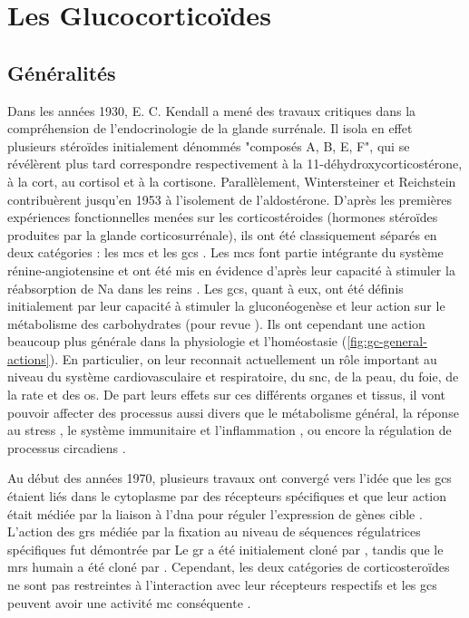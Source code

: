 \documentclass[../main.tex]{subfiles}
\begin{document}
\chapter{Les Glucocorticoïdes}


\section{Généralités}
Dans les années 1930, E. C. Kendall a mené des travaux critiques dans la compréhension de l'endocrinologie de la glande surrénale.
Il isola en effet plusieurs stéroïdes initialement dénommés "composés A, B, E, F", qui se révélèrent plus tard correspondre respectivement à la 11-déhydroxycorticostérone, à la \gls{cort}, au cortisol et à la cortisone.
Parallèlement, Wintersteiner et Reichstein contribuèrent jusqu'en 1953 à l'isolement de l'aldostérone.
D'après les premières expériences fonctionnelles menées sur les corticostéroides (hormones stéroïdes produites par la glande corticosurrénale), ils ont été classiquement séparés en deux catégories : les \glspl{mc} et les \glspl{gc} \citep{Simpson1952,Simpson1954}.
Les \glspl{mc} font partie intégrante du système rénine-angiotensine et ont été mis en évidence d'après leur capacité à stimuler la réabsorption de \gls{Na} dans les reins \citep{Gomez-Sanchez1996}.
Les \glspl{gc}, quant à eux, ont été définis initialement par leur capacité à stimuler la gluconéogenèse et leur action sur le métabolisme des carbohydrates (pour revue \citealp{McMahon1988}).
Ils ont cependant une action beaucoup plus générale dans la physiologie et l'homéostasie (\autoref{fig:gc-general-actions}).
En particulier, on leur reconnait actuellement un rôle important au niveau du système cardiovasculaire et respiratoire, du \gls{snc}, de la peau, du foie, de la rate et des os.
De part leurs effets sur ces différents organes et tissus, il vont pouvoir affecter des processus aussi divers que le métabolisme général, la réponse au stress \citep{Sapolsky2000}, le système immunitaire et l'inflammation \citep{Busillo2013}, ou encore la régulation de processus circadiens \citep{Dickmeis2009}.



Au début des années 1970, plusieurs travaux ont convergé vers l'idée que les \glspl{gc} étaient liés dans le cytoplasme par des récepteurs spécifiques \citep{Baxter1971,Rousseau1972} et que leur action était médiée par la liaison à l'\gls{dna} pour réguler l'expression de gènes cible \citep{Baxter1972,Payvar1981}.
L'action des \glspl{gr} médiée par la fixation au niveau de séquences régulatrices spécifiques fut démontrée par \citet{Chandler1983,Karin1984,Slater1985}
Le \gls{gr} a été initialement cloné par \citet{Weinberger1985}, tandis que le \glspl{mr} humain a été cloné par \citet{Arriza1987}.
Cependant, les deux catégories de corticosteroïdes ne sont pas restreintes à l'interaction avec leur récepteurs respectifs et les \glspl{gc} peuvent avoir une activité \gls{mc} conséquente \citep{Funder1973,Reul1990}.
\end{document}
